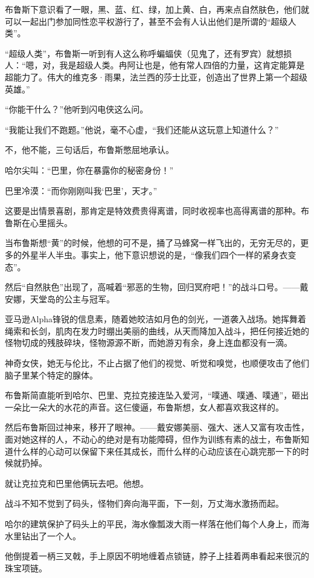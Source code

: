 \documentclass[../main]{subfiles}
\begin{document}
布鲁斯下意识看了一眼，黑、蓝、红、绿，加上黄、白，再来点自然肤色，他们就可以一起出门参加同性恋平权游行了，甚至不会有人认出他们是所谓的“超级人类”。

“超级人类”，布鲁斯一听到有人这么称呼蝙蝠侠（见鬼了，还有罗宾）就想损人：“嗯，对，我是超级人类。冉阿让也是，他有常人四倍的力量，这肯定能算是超能力了。伟大的维克多·雨果，法兰西的莎士比亚，创造出了世界上第一个超级英雄。”

“你能干什么？”他听到闪电侠这么问。

“我能让我们不跑题。”他说，毫不心虚，“我们还能从这玩意上知道什么？”

不，他不能，三句话后，布鲁斯憋屈地承认。

哈尔尖叫：“巴里，你在暴露你的秘密身份！”

巴里冷漠：“而你刚刚叫我`巴里'，天才。”

这要是出情景喜剧，那肯定是特效费贵得离谱，同时收视率也高得离谱的那种。布鲁斯在心里摇头。

当布鲁斯想“黄”的时候，他想的可不是，捅了马蜂窝一样飞出的，无穷无尽的，更多的外星半人半虫。事实上，他下意识想说的是，“像我们四个一样的紧身衣变态”。

然后“自然肤色”出现了，高喊着“邪恶的生物，回归冥府吧！”的战斗口号。——戴安娜，天堂岛的公主与冠军。

亚马逊Alpha锋锐的信息素，随着她皎洁如月色的剑光，一道袭入战场。她挥舞着绳索和长剑，肌肉在发力时绷出美丽的曲线，从天而降加入战斗，把任何接近她的怪物切成的残肢碎块，怪物源源不断，而她游刃有余，身上连血都没有一滴。

神奇女侠，她无与伦比，不止占据了他们的视觉、听觉和嗅觉，也顺便攻击了他们脑子里某个特定的腺体。

布鲁斯简直能听到哈尔、巴里、克拉克接连坠入爱河，“噗通、噗通、噗通”，砸出一朵比一朵大的水花的声音。这仨傻逼，布鲁斯想，女人都喜欢我这样的。

然后布鲁斯回过神来，移开了眼神。——戴安娜美丽、强大、迷人又富有攻击性，面对她这样的人，不动心的绝对是有功能障碍，但作为训练有素的战士，布鲁斯知道什么样的心动可以保留下来任其成长，而什么样的心动应该在心跳完那一下的时候就扔掉。

就让克拉克和巴里他俩玩去吧。他想。

战斗不知不觉到了码头，怪物们奔向海平面，下一刻，万丈海水激扬而起。

哈尔的建筑保护了码头上的平民，海水像瓢泼大雨一样落在他们每个人身上，而海水里钻出了一个人。

他倒提着一柄三叉戟，手上原因不明地缠着点锁链，脖子上挂着两串看起来很沉的珠宝项链。
\end{document}
